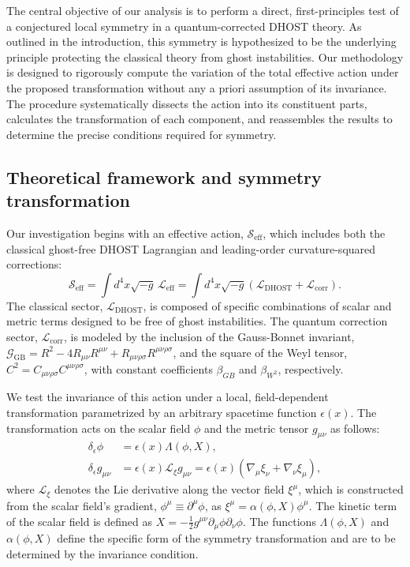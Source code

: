 \documentclass[twocolumn]{aastex631}
\begin{document}
The central objective of our analysis is to perform a direct, first-principles test of a conjectured local symmetry in a quantum-corrected DHOST theory. As outlined in the introduction, this symmetry is hypothesized to be the underlying principle protecting the classical theory from ghost instabilities. Our methodology is designed to rigorously compute the variation of the total effective action under the proposed transformation without any a priori assumption of its invariance. The procedure systematically dissects the action into its constituent parts, calculates the transformation of each component, and reassembles the results to determine the precise conditions required for symmetry.

\subsection{Theoretical framework and symmetry transformation}

Our investigation begins with an effective action, $\mathcal{S}_{\text{eff}}$, which includes both the classical ghost-free DHOST Lagrangian and leading-order curvature-squared corrections:
\begin{equation}
    \mathcal{S}_{\text{eff}} = \int d^4x \sqrt{-g} \, \mathcal{L}_{\text{eff}} = \int d^4x \sqrt{-g} \left( \mathcal{L}_{\text{DHOST}} + \mathcal{L}_{\text{corr}} \right).
\end{equation}
The classical sector, $\mathcal{L}_{\text{DHOST}}$, is composed of specific combinations of scalar and metric terms designed to be free of ghost instabilities. The quantum correction sector, $\mathcal{L}_{\text{corr}}$, is modeled by the inclusion of the Gauss-Bonnet invariant, $\mathcal{G}_{\text{GB}} = R^2 - 4R_{\mu\nu}R^{\mu\nu} + R_{\mu\nu\rho\sigma}R^{\mu\nu\rho\sigma}$, and the square of the Weyl tensor, $C^2 = C_{\mu\nu\rho\sigma}C^{\mu\nu\rho\sigma}$, with constant coefficients $\beta_{GB}$ and $\beta_{W^2}$, respectively.

We test the invariance of this action under a local, field-dependent transformation parametrized by an arbitrary spacetime function $\epsilon(x)$. The transformation acts on the scalar field $\phi$ and the metric tensor $g_{\mu\nu}$ as follows:
\begin{align}
    \delta_\epsilon \phi &= \epsilon(x) \Lambda(\phi, X), \\
    \delta_\epsilon g_{\mu\nu} &= \epsilon(x) \mathcal{L}_{\xi} g_{\mu\nu} = \epsilon(x) (\nabla_\mu \xi_\nu + \nabla_\nu \xi_\mu),
\end{align}
where $\mathcal{L}_{\xi}$ denotes the Lie derivative along the vector field $\xi^\mu$, which is constructed from the scalar field's gradient, $\phi^\mu \equiv \partial^\mu\phi$, as $\xi^\mu = \alpha(\phi, X)\phi^\mu$. The kinetic term of the scalar field is defined as $X = -\frac{1}{2}g^{\mu\nu}\partial_\mu\phi\partial_\nu\phi$. The functions $\Lambda(\phi, X)$ and $\alpha(\phi, X)$ define the specific form of the symmetry transformation and are to be determined by the invariance condition.
\end{document}

